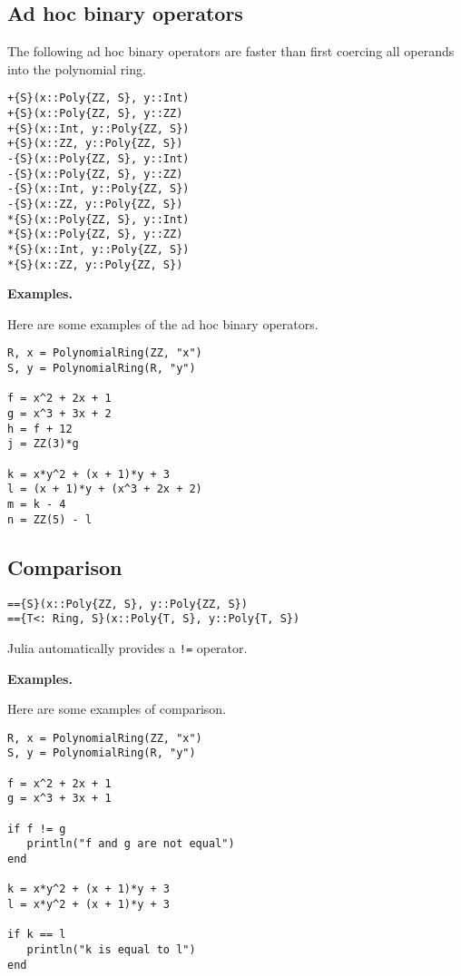 \documentclass[a4paper,10pt]{article}
\newcommand{\code}{\lstinline}
\begin{document}
{{{\subsection{Ad hoc binary operators}

The following ad hoc binary operators are faster than first coercing all
operands into the polynomial ring.

\begin{lstlisting}
+{S}(x::Poly{ZZ, S}, y::Int)
+{S}(x::Poly{ZZ, S}, y::ZZ)
+{S}(x::Int, y::Poly{ZZ, S})
+{S}(x::ZZ, y::Poly{ZZ, S})
-{S}(x::Poly{ZZ, S}, y::Int)
-{S}(x::Poly{ZZ, S}, y::ZZ)
-{S}(x::Int, y::Poly{ZZ, S})
-{S}(x::ZZ, y::Poly{ZZ, S})
*{S}(x::Poly{ZZ, S}, y::Int)
*{S}(x::Poly{ZZ, S}, y::ZZ)
*{S}(x::Int, y::Poly{ZZ, S})
*{S}(x::ZZ, y::Poly{ZZ, S})
\end{lstlisting}

\textbf{Examples.}

Here are some examples of the ad hoc binary operators.

\begin{lstlisting}
R, x = PolynomialRing(ZZ, "x")
S, y = PolynomialRing(R, "y")

f = x^2 + 2x + 1
g = x^3 + 3x + 2
h = f + 12
j = ZZ(3)*g

k = x*y^2 + (x + 1)*y + 3
l = (x + 1)*y + (x^3 + 2x + 2)
m = k - 4
n = ZZ(5) - l
\end{lstlisting}

\subsection{Comparison}

\begin{lstlisting}
=={S}(x::Poly{ZZ, S}, y::Poly{ZZ, S})
=={T<: Ring, S}(x::Poly{T, S}, y::Poly{T, S})
\end{lstlisting}

Julia automatically provides a \code{!=} operator.

\textbf{Examples.}

Here are some examples of comparison.

\begin{lstlisting}
R, x = PolynomialRing(ZZ, "x")
S, y = PolynomialRing(R, "y")

f = x^2 + 2x + 1
g = x^3 + 3x + 1

if f != g
   println("f and g are not equal")
end

k = x*y^2 + (x + 1)*y + 3
l = x*y^2 + (x + 1)*y + 3

if k == l
   println("k is equal to l")
end
\end{lstlisting}

}}}
\end{document}
